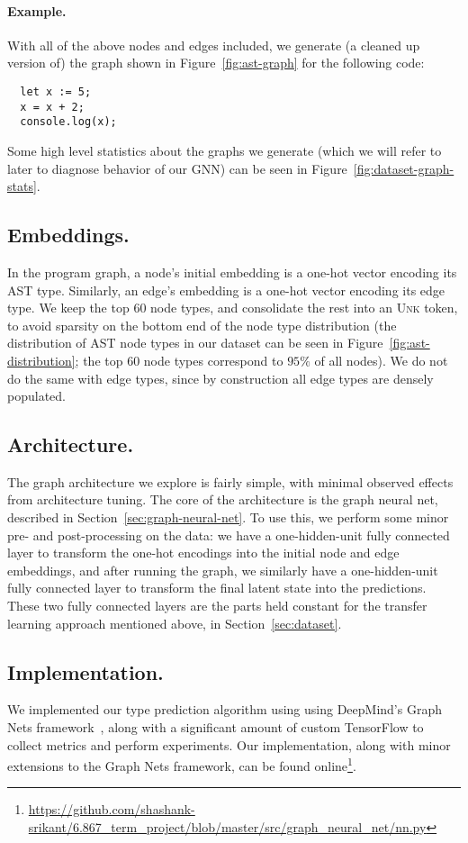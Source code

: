 \paragraph{Example.}
With all of the above nodes and edges included, we generate (a cleaned up version of) the graph shown in Figure~\ref{fig:ast-graph} for the following code:
\begin{lstlisting}
  let x := 5;
  x = x + 2;
  console.log(x);
\end{lstlisting}

Some high level statistics about the graphs we generate (which we will refer to later to diagnose behavior of our GNN) can be seen in Figure~\ref{fig:dataset-graph-stats}.

\subsection{Embeddings.}

In the program graph, a node's initial embedding is a one-hot vector encoding its AST type.
Similarly, an edge's embedding is a one-hot vector encoding its edge type.
We keep the top 60 node types, and consolidate the rest into an \textsc{Unk} token, to avoid sparsity on the bottom end of the node type distribution (the distribution of AST node types in our dataset can be seen in Figure~\ref{fig:ast-distribution}; the top 60 node types correspond to $95\%$ of all nodes).
We do not do the same with edge types, since by construction all edge types are densely populated.


\subsection{Architecture.}

The graph architecture we explore is fairly simple, with minimal observed effects from architecture tuning.
The core of the architecture is the graph neural net, described in Section~\ref{sec:graph-neural-net}.
To use this, we perform some minor pre- and post-processing on the data: we have a one-hidden-unit fully connected layer to transform the one-hot encodings into the initial node and edge embeddings, and after running the graph, we similarly have a one-hidden-unit fully connected layer to transform the final latent state into the predictions.
These two fully connected layers are the parts held constant for the transfer learning approach mentioned above, in Section~\ref{sec:dataset}.

\subsection{Implementation.}

We implemented our type prediction algorithm using using DeepMind's Graph Nets framework~\cite{deepmind2018graph}, along with a significant amount of custom TensorFlow to collect metrics and perform experiments.
Our implementation, along with minor extensions to the Graph Nets framework, can be found online\footnote{\url{https://github.com/shashank-srikant/6.867_term_project/blob/master/src/graph_neural_net/nn.py}}.